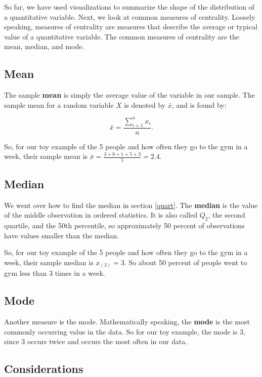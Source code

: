 \documentclass[
]{book}
\begin{document}
So far, we have used visualizations to summarize the shape of the distribution of a quantitative variable. Next, we look at common measures of centrality. Loosely speaking, measures of centrality are measures that describe the average or typical value of a quantitative variable. The common measures of centrality are the mean, median, and mode.

\subsection{Mean}\label{mean}

The sample \textbf{mean} is simply the average value of the variable in our sample. The sample mean for a random variable \(X\) is denoted by \(\bar{x}\), and is found by:

\begin{equation} 
\bar{x} = \frac{\sum_{i=1}^n x_i}{n}.
\label{eq:mean}
\end{equation}

So, for our toy example of the 5 people and how often they go to the gym in a week, their sample mean is \(\bar{x} = \frac{3+0+1+5+3}{5} = 2.4\).

\subsection{Median}\label{median}

We went over how to find the median in section \ref{quart}. The \textbf{median} is the value of the middle observation in ordered statistics. It is also called \(Q_2\), the second quartile, and the 50th percentile, so approximately 50 percent of observations have values smaller than the median.

So, for our toy example of the 5 people and how often they go to the gym in a week, their sample median is \(x_{(3)} = 3\). So about 50 percent of people went to gym less than 3 times in a week.

\subsection{Mode}\label{mode}

Another measure is the mode. Mathematically speaking, the \textbf{mode} is the most commonly occurring value in the data. So for our toy example, the mode is 3, since 3 occurs twice and occurs the most often in our data.

\subsection{Considerations}\label{considerations}
\end{document}
